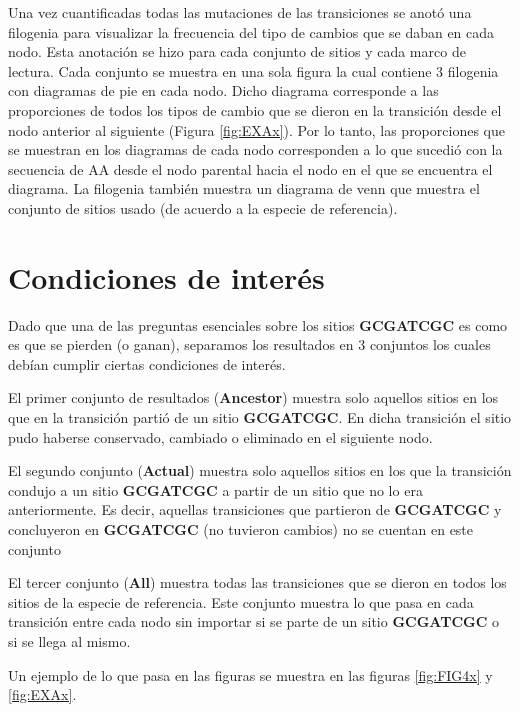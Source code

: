 \documentclass[
]{book}
\begin{document}
Una vez cuantificadas todas las mutaciones de las transiciones se anotó una filogenia para visualizar la frecuencia del tipo de cambios que se daban en cada nodo. Esta anotación se hizo para cada conjunto de sitios y cada marco de lectura. Cada conjunto se muestra en una sola figura la cual contiene 3 filogenia con diagramas de pie en cada nodo. Dicho diagrama corresponde a las proporciones de todos los tipos de cambio que se dieron en la transición desde el nodo anterior al siguiente (Figura \ref{fig:EXAx}). Por lo tanto, las proporciones que se muestran en los diagramas de cada nodo corresponden a lo que sucedió con la secuencia de AA desde el nodo parental hacia el nodo en el que se encuentra el diagrama. La filogenia también muestra un diagrama de venn que muestra el conjunto de sitios usado (de acuerdo a la especie de referencia).

\hypertarget{condiciones-de-interuxe9s}{%
\section{Condiciones de interés}\label{condiciones-de-interuxe9s}}

Dado que una de las preguntas esenciales sobre los sitios \textbf{GCGATCGC} es como es que se pierden (o ganan), separamos los resultados en 3 conjuntos los cuales debían cumplir ciertas condiciones de interés.

El primer conjunto de resultados (\textbf{Ancestor}) muestra solo aquellos sitios en los que en la transición partió de un sitio \textbf{GCGATCGC}. En dicha transición el sitio pudo haberse conservado, cambiado o eliminado en el siguiente nodo.

El segundo conjunto (\textbf{Actual}) muestra solo aquellos sitios en los que la transición condujo a un sitio \textbf{GCGATCGC} a partir de un sitio que no lo era anteriormente. Es decir, aquellas transiciones que partieron de \textbf{GCGATCGC} y concluyeron en \textbf{GCGATCGC} (no tuvieron cambios) no se cuentan en este conjunto

El tercer conjunto (\textbf{All}) muestra todas las transiciones que se dieron en todos los sitios de la especie de referencia. Este conjunto muestra lo que pasa en cada transición entre cada nodo sin importar si se parte de un sitio \textbf{GCGATCGC} o si se llega al mismo.

Un ejemplo de lo que pasa en las figuras se muestra en las figuras \ref{fig:FIG4x} y \ref{fig:EXAx}.
\end{document}
